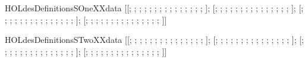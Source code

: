\begin{SaveVerbatim}{HOLdesDefinitionsSOneXXdata}
\HOLTokenTurnstile{}  \HOLSymConst{=}
   [[; ; ; ; ; ; ; ; ; ; ; ; ; ; ; ];
    [; ; ; ; ; ; ; ; ; ; ; ; ; ; ; ];
    [; ; ; ; ; ; ; ; ; ; ; ; ; ; ; ];
    [; ; ; ; ; ; ; ; ; ; ; ; ; ; ; ]]
\end{SaveVerbatim}
\newcommand{\HOLdesDefinitionsSOneXXdata}{\UseVerbatim{HOLdesDefinitionsSOneXXdata}}
\begin{SaveVerbatim}{HOLdesDefinitionsSTwoXXdata}
\HOLTokenTurnstile{}  \HOLSymConst{=}
   [[; ; ; ; ; ; ; ; ; ; ; ; ; ; ; ];
    [; ; ; ; ; ; ; ; ; ; ; ; ; ; ; ];
    [; ; ; ; ; ; ; ; ; ; ; ; ; ; ; ];
    [; ; ; ; ; ; ; ; ; ; ; ; ; ; ; ]]
\end{SaveVerbatim}
\newcommand{\HOLdesDefinitionsSTwoXXdata}{\UseVerbatim{HOLdesDefinitionsSTwoXXdata}}
